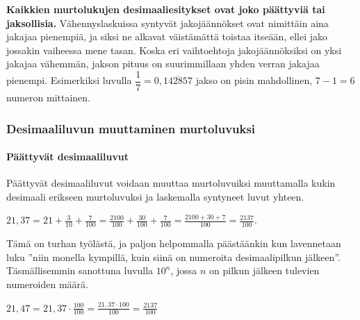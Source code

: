 {\bf Kaikkien murtolukujen desimaaliesitykset ovat joko päättyviä tai jaksollisia.}
Vähennyslaskuissa syntyvät jakojäännökset ovat nimittäin aina jakajaa pienempiä, ja siksi
ne alkavat väistämättä toistaa itseään, ellei jako jossakin vaiheessa mene tasan.
Koska eri vaihtoehtoja jakojäännöksiksi on yksi jakajaa vähemmän,
jakson pituus on suurimmillaan yhden verran jakajaa pienempi. Esimerkiksi luvulla
$\dfrac{1}{7}=0,\overline{142857}$ jakso on pisin mahdollinen, $7-1=6$ numeron mittainen.


\subsubsection*{Desimaaliluvun muuttaminen murtoluvuksi}

\paragraph*{Päättyvät desimaaliluvut}

Päättyvät desimaaliluvut voidaan muuttaa murtoluvuiksi muuttamalla kukin
desimaali erikseen murtoluvuksi ja laskemalla syntyneet luvut yhteen.

\begin{esimerkki}
$21,37 = 21+ \frac{3}{10}+\frac{7}{100} =
\frac{2100}{100}+\frac{30}{100}+\frac{7}{100}
 = \frac{2100+30+7}{100} = \frac{2137}{100}.$
\end{esimerkki}

Tämä on turhan työlästä, ja paljon helpommalla päästäänkin kun lavennetaan luku ''niin monella kympillä, kuin siinä on numeroita desimaalipilkun jälkeen''. Täsmällisemmin sanottuna luvulla $10^n$, jossa $n$ on pilkun jälkeen tulevien numeroiden määrä.

\begin{esimerkki}
$21,47 = 21,37 \cdot  \frac{100}{100} = \frac{21,37 \cdot 100}{100} = \frac{2137}{100}$
\end{esimerkki}

